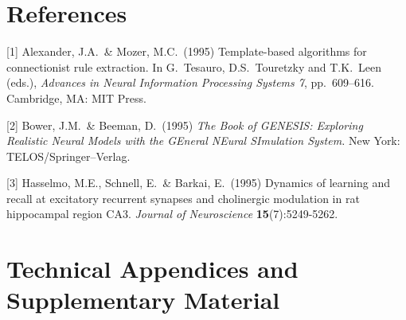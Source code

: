 \documentclass{article}
\begin{document}
\begin{ack}
\end{ack}

\section*{References}


\medskip


{
\small


[1] Alexander, J.A.\ \& Mozer, M.C.\ (1995) Template-based algorithms for
connectionist rule extraction. In G.\ Tesauro, D.S.\ Touretzky and T.K.\ Leen
(eds.), {\it Advances in Neural Information Processing Systems 7},
pp.\ 609--616. Cambridge, MA: MIT Press.


[2] Bower, J.M.\ \& Beeman, D.\ (1995) {\it The Book of GENESIS: Exploring
  Realistic Neural Models with the GEneral NEural SImulation System.}  New York:
TELOS/Springer--Verlag.


[3] Hasselmo, M.E., Schnell, E.\ \& Barkai, E.\ (1995) Dynamics of learning and
recall at excitatory recurrent synapses and cholinergic modulation in rat
hippocampal region CA3. {\it Journal of Neuroscience} {\bf 15}(7):5249-5262.
}



\appendix

\section{Technical Appendices and Supplementary Material}


\newpage
\end{document}
